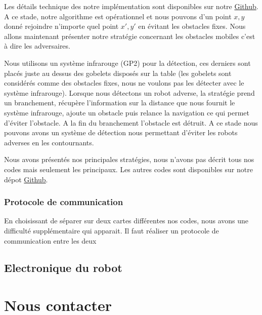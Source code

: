 \documentclass[a4paper,10pt]{article}
\begin{document}
\begin{spacing}{1.5}
Les détails technique des notre implémentation sont disponibles sur notre
\href{https://github.com/eirbot/eirbot2020-1A/blob/master/code/rasp/src/navigation.cpp}{Github}.
A ce stade, notre algorithme est opérationnel et nous pouvons d'un point $x,y$
donné rejoindre n'importe quel point $x',y'$ en évitant les obstacles fixes.
Nous allons maintenant présenter notre stratégie concernant les obstacles
mobiles c'est à dire les adversaires.

Nous utilisons un système infrarouge (GP2) pour la détection, ces derniers sont
placés juste au dessus des gobelets disposés sur la table (les gobelets sont
considérés comme des obstacles fixes, nous ne voulons pas les détecter avec le
système infrarouge). Lorsque nous détectons un robot adverse, la stratégie prend
un branchement, récupère l'information sur la distance que nous fournit le
système infrarouge, ajoute un obstacle puis relance la navigation ce qui permet d'éviter l'obstacle.
A la fin du branchement l'obstacle est détruit. A ce stade nous pouvons avons un
système de détection nous permettant d'éviter les robots adverses en les
contournants.

Nous avons présentés nos principales stratégies, nous n'avons pas décrit tous
nos codes mais seulement les principaux. Les autres codes sont disponibles sur
notre dépot \href{https://github.com/eirbot/eirbot2020-1A}{Github}.

\subsubsection{Protocole de communication}
En choisissant de séparer sur deux cartes différentes nos codes, nous avons une
difficulté supplémentaire qui apparait. Il faut réaliser un protocole de
communication entre les deux

\subsection{Electronique du robot}

\newpage
\section{Nous contacter}

\newpage
\end{spacing}
\end{document}
